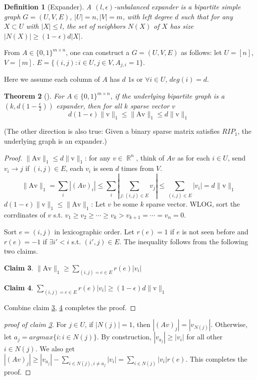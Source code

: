 \documentclass[11pt]{article}
\newtheorem{theorem}{Theorem}
\newtheorem{definition}[theorem]{Definition}
\newtheorem{claim}[theorem]{Claim}
\newcommand{\rr}{\operatorname{\mathbb{R}}}
\newcommand{\lpnorm}[2]{\operatorname{\|{#1}\|_{#2}}}
\begin{document}
\begin{definition} [Expander]
\em A $(l,\epsilon)$-{\em unbalanced expander} is a bipartite simple graph $G=(U,V,E)$, $|U|=n, |V|=m$, with
left degree $d$ such that for any $X \subset U$ with $|X| \leq l$, the
set of neighbors $N(X)$ of $X$ has size $|N(X)| \geq (1-\epsilon) d |X|$.
\end{definition}
From $A \in \{0, 1\}^{m \times n}$, one can construct a $G = (U, V, E)$ as follows: let $U = [n]$, $V = [m]$. $E = \{(i, j): i \in U, j \in V, A_{j, i} = 1\}$.

Here we assume each column of $A$ has $d$ $1$s or $\forall i \in U$, $deg(i) = d$.

\begin{theorem} [\cite{BGIKS 08}]
For $A \in \{0, 1\}^{m \times n}$, if the underlying bipartite graph is a $(k, d(1 - \frac{\epsilon}{2}))$ expander, then for all $k$ sparse vector $v$
\[d(1 - \epsilon)\lpnorm{v}{1} \leq \lpnorm{Av}{1} \leq d\lpnorm{v}{1}\]
\end{theorem}
(The other direction is also true: Given a binary sparse matrix satisfies $RIP_1$, the underlying graph is an expander.)
\begin{proof}
$\lpnorm{Av}{1} \leq d\lpnorm{v}{1}$: for any $v \in \rr^n$, think of $Av$ as for each $i \in U$, send $v_i \to j$ if $(i, j) \in E$, each $v_i$ is seen $d$ times from $V$. \[\lpnorm{Av}{1} = \sum_i |(Av)_i| \leq \sum_i |\sum_{j: (i, j) \in E}v_j| \leq \sum_{(i, j) \in E}|v_i| = d\lpnorm{v}{1}\]
$d(1 - \epsilon)\lpnorm{v}{1} \leq \lpnorm{Av}{1}$: Let $v$ be some $k$ sparse vector. WLOG, sort the corrdinates of $v$ s.t. $v_1 \geq v_2 \geq \cdots \geq v_k > v_{k + 1} = \cdots = v_n = 0$.

Sort $e = (i, j)$ in lexicographic order. Let $r(e) = 1$ if $e$ is not seen before and $r(e) = -1$ if $\exists i' < i$ s.t. $(i', j) \in E$. The inequality follows from the following two claims.
\begin{claim}\label{c:1}
$\lpnorm{Av}{1}  \geq \sum_{(i, j) = e \in E}r(e)|v_i|$
\end{claim}
\begin{claim}\label{c:2}
$\sum_{(i, j) = e \in E}r(e)|v_i| \geq (1 - \epsilon)d \lpnorm{v}{1}$
\end{claim}
Combine claim \ref{c:1}, \ref{c:2} completes the proof.
\end{proof}
\begin{proof}[proof of claim \ref{c:1}]
For $j \in U$, if $|N(j)| = 1$, then $|(Av)_j| = |v_{N(j)}|$. 
Otherwise, let $a_j = argmax\{i: i \in N(j)\}$. By construction, $|v_{a_j}| \geq |v_i|$ for all other $i \in N(j)$. We also get $|(Av)_j| \geq |v_{a_j}| - \sum_{i \in N(j), i \neq a_j}|v_i| = \sum_{i \in N(j)}|v_i|r(e)$. This completes the proof. 
\end{proof}
\end{document}
